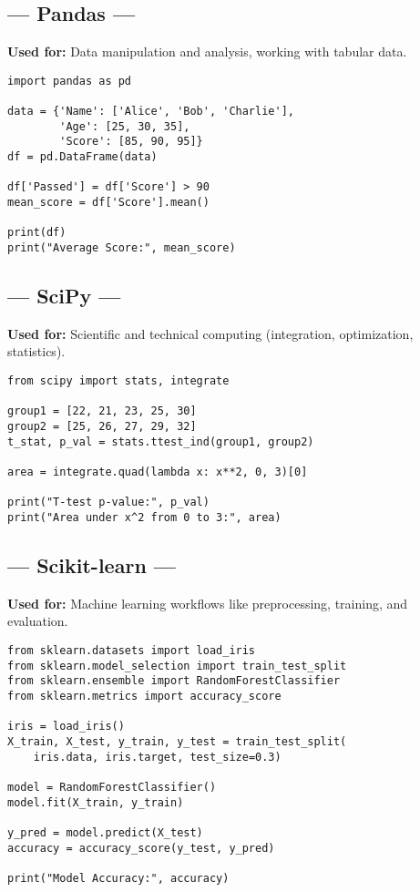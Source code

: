 \documentclass[11pt]{article}
\begin{document}
\subsection*{--- Pandas ---}
\textbf{Used for:} Data manipulation and analysis, working with tabular data.
\begin{lstlisting}
import pandas as pd

data = {'Name': ['Alice', 'Bob', 'Charlie'],
        'Age': [25, 30, 35],
        'Score': [85, 90, 95]}
df = pd.DataFrame(data)

df['Passed'] = df['Score'] > 90
mean_score = df['Score'].mean()

print(df)
print("Average Score:", mean_score)
\end{lstlisting}

\subsection*{--- SciPy ---}
\textbf{Used for:} Scientific and technical computing (integration, optimization, statistics).
\begin{lstlisting}
from scipy import stats, integrate

group1 = [22, 21, 23, 25, 30]
group2 = [25, 26, 27, 29, 32]
t_stat, p_val = stats.ttest_ind(group1, group2)

area = integrate.quad(lambda x: x**2, 0, 3)[0]

print("T-test p-value:", p_val)
print("Area under x^2 from 0 to 3:", area)
\end{lstlisting}

\subsection*{--- Scikit-learn ---}
\textbf{Used for:} Machine learning workflows like preprocessing, training, and evaluation.
\begin{lstlisting}
from sklearn.datasets import load_iris
from sklearn.model_selection import train_test_split
from sklearn.ensemble import RandomForestClassifier
from sklearn.metrics import accuracy_score

iris = load_iris()
X_train, X_test, y_train, y_test = train_test_split(
    iris.data, iris.target, test_size=0.3)

model = RandomForestClassifier()
model.fit(X_train, y_train)

y_pred = model.predict(X_test)
accuracy = accuracy_score(y_test, y_pred)

print("Model Accuracy:", accuracy)
\end{lstlisting}
\end{document}
